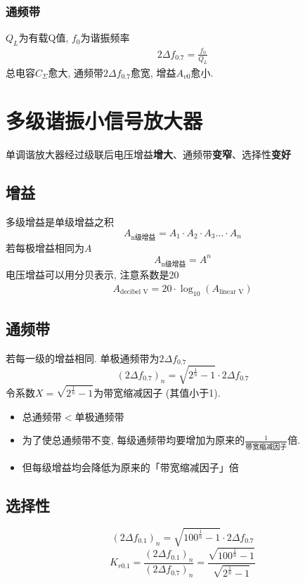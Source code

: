 \documentclass[a4paper]{report}
\begin{document}
\subsubsection{通频带}
$Q_L$为有载Q值, $f_0$为谐振频率
\begin{align*}
  2\Delta f_{0.7}=\frac{f_0}{Q_L}
\end{align*}
总电容$C_\Sigma$愈大, 通频带$2\Delta f_{0.7}$愈宽, 增益$A_{v0}$愈小. 
\section{多级谐振小信号放大器}
单调谐放大器经过级联后电压增益\textbf{增大}、通频带\textbf{变窄}、选择性\textbf{变好}
\subsection{增益}
多级增益是单级增益之积
$$A_{\text{n级增益}}=A_1\cdot A_2\cdot A_3\dots \cdot A_n$$
若每极增益相同为$A$
$$A_{\text{n级增益}}=A^n$$
电压增益可以用分贝表示, 注意系数是20
\begin{align*}
  A_{\text{decibel V}}=20\cdot \log_{10}(A_{\text{linear V}})
\end{align*}
\subsection{通频带}
若每一级的增益相同. 单极通频带为$2\Delta f_{0.7}$
$$(2\Delta f_{0.7})_n=\sqrt{2^{\frac{1}{n}}-1}\cdot 2\Delta f_{0.7}$$
令系数$X=\sqrt{2^{\frac{1}{n}}-1}$为带宽缩减因子 (其值小于1). 
\begin{itemize}
  \item 总通频带$<$单极通频带
  \item 为了使总通频带不变, 每级通频带均要增加为原来的$\frac{1}{\text{带宽缩减因子}}$倍. 
  \item 但每级增益均会降低为原来的「带宽缩减因子」倍
\end{itemize}
\subsection{选择性}
$$(2\Delta f_{0.1})_n=\sqrt{100^{\frac{1}{n}}-1}\cdot 2\Delta f_{0.7}$$
$$K_{r0.1}=\frac{(2\Delta f_{0.1})_n}{(2\Delta f_{0.7})_n}=\frac{\sqrt{100^{\frac{1}{n}}-1}}{\sqrt{2^{\frac{1}{n}}-1}}$$
  \begin{table}[H]
    \centering
    \caption{级别与矩形系数}
  \end{table}%
\end{document}
